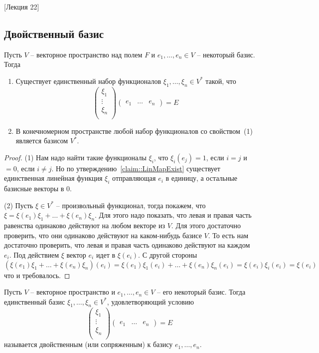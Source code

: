 [Лекция 22]


\subsection{Двойственный базис}

\begin{claim}
\label{claim:DualBasis}
Пусть $V$ -- векторное пространство над полем $F$ и $e_1,\ldots,e_n\in V$ -- некоторый базис.
Тогда
\begin{enumerate}
\item Существует единственный набор функционалов $\xi_1,\ldots,\xi_n\in V^*$ такой, что 
\[
\begin{pmatrix}
{\xi_1}\\{\vdots}\\{\xi_n}\\
\end{pmatrix}
\begin{pmatrix}
{e_1}&{\ldots}&{e_n}
\end{pmatrix}
=
E
\]

\item В конечномерном пространстве любой набор функционалов со свойством~(1) является базисом $V^*$.
\end{enumerate}
\end{claim}
\begin{proof}
(1) Нам надо найти такие функционалы $\xi_i$, что $\xi_i(e_j) = 1$, если $i = j$ и $ = 0$, если $i\neq j$.
Но по утверждению~\ref{claim::LinMapExist} существует единственная линейная функция $\xi_i$ отправляющая $e_i$ в единицу, а остальные базисные векторы в $0$.

(2) Пусть $\xi \in V^*$ -- произвольный функционал, тогда покажем, что $\xi = \xi(e_1)\xi_1 + \ldots + \xi(e_n)\xi_n$.
Для этого надо показать, что левая и правая часть равенства одинаково действуют на любом векторе из $V$.
Для этого достаточно проверить, что они одинаково действуют на каком-нибудь базисе $V$.
То есть нам достаточно проверить, что левая и правая часть одинаково действуют на каждом $e_i$.
Под действием $\xi$ вектор $e_i$ идет в $\xi(e_i)$.
С другой стороны
\[
(\xi(e_1)\xi_1 + \ldots + \xi(e_n)\xi_n)(e_i) = \xi(e_1)\xi_1(e_i) + \ldots + \xi(e_n)\xi_n(e_i) = \xi(e_i)\xi_i(e_i) = \xi(e_i)
\]
что и требовалось.
\end{proof}

\begin{definition}
\label{def::DualBasis}
Пусть $V$ -- векторное пространство и $e_1,\ldots,e_n\in V$ -- его некоторый базис.
Тогда единственный базис $\xi_1,\ldots,\xi_n\in V^*$, удовлетворяющий условию
\[
\begin{pmatrix}
{\xi_1}\\{\vdots}\\{\xi_n}\\
\end{pmatrix}
\begin{pmatrix}
{e_1}&{\ldots}&{e_n}
\end{pmatrix}
=
E
\]
называется двойственным (или сопряженным) к базису $e_1,\ldots,e_n$.
\end{definition}

